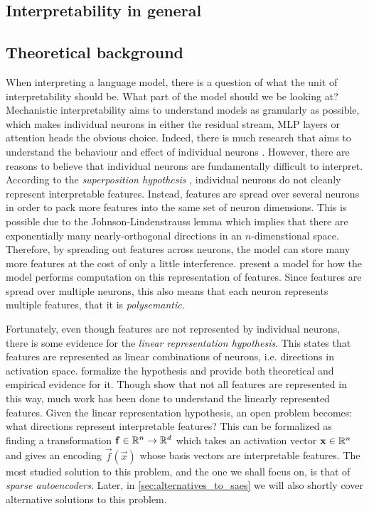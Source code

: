 \documentclass[../../main.tex]{subfiles}
\begin{document}
\subsection{Interpretability in general}



\subsection{Theoretical background}
When interpreting a language model, there is a question of what the unit of interpretability should be.
What part of the model should we be looking at?
Mechanistic interpretability aims to understand models as granularly as possible, which makes individual neurons in either the residual stream, MLP layers or attention heads the obvious choice.
Indeed, there is much research that aims to understand the behaviour and effect of individual neurons \citep{foote_neuron_2023}\citep{bills_language_2023}.
However, there are reasons to believe that individual neurons are fundamentally difficult to interpret.
According to the \emph{superposition hypothesis} \citep{elhage_toy_2022}, individual neurons do not cleanly represent interpretable features.
Instead, features are spread over several neurons in order to pack more features into the same set of neuron dimensions.
This is possible due to the Johnson-Lindenstrauss lemma which implies that there are exponentially many nearly-orthogonal directions in an $n$-dimenstional space.
Therefore, by spreading out features across neurons, the model can store many more features at the cost of only a little interference.
\citet{vaintrob_toward_2024} present a model for how the model performs computation on this representation of features.
Since features are spread over multiple neurons, this also means that each neuron represents multiple features, that it is \emph{polysemantic}.

Fortunately, even though features are not represented by individual neurons, there is some evidence for the \emph{linear representation hypothesis}.
This states that features are represented as linear combinations of neurons, i.e. directions in activation space.
\citet{park_linear_2023} formalize the hypothesis and provide both theoretical and empirical evidence for it.
Though \citet{engels_not_2024} show that not all features are represented in this way, much work has been done to understand the linearly represented features.
Given the linear representation hypothesis, an open problem becomes: what directions represent interpretable features?
This can be formalized as finding a transformation $\mathbf{f}\in\mathbb{R}^n\to\mathbb{R}^d$ which takes an activation vector $\mathbf{x}\in\mathbb{R}^n$ and gives an encoding $\vec f(\vec x)$ whose basis vectors are interpretable features.
The most studied solution to this problem, and the one we shall focus on, is that of \emph{sparse autoencoders}.
Later, in \ref{sec:alternatives_to_saes} we will also shortly cover alternative solutions to this problem.
\end{document}
